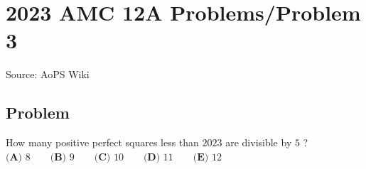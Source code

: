 \documentclass[12pt]{article}
\begin{document}
\section*{{2023 AMC 12A Problems/Problem 3}}
Source: AoPS Wiki

\subsection*{Problem}
How many positive perfect squares less than $2023$ are divisible by $5$ ? $\textbf{(A) } 8 \qquad\textbf{(B) }9 \qquad\textbf{(C) }10 \qquad\textbf{(D) }11 \qquad\textbf{(E) } 12$
\end{document}
